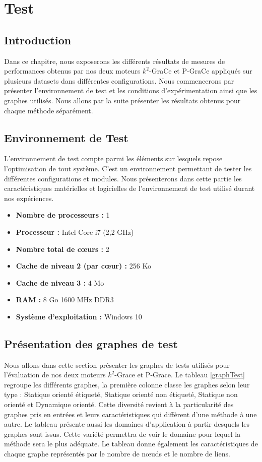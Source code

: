 \chapter{Test}
	\section{Introduction}
	
Dans ce chapitre, nous exposerons les différents résultats de mesures de performances obtenus par nos deux moteurs $k^2$-GraCe et P-GraCe appliqués sur plusieurs datasets dans différentes configurations. Nous commencerons par présenter l'environnement de test et les conditions d'expérimentation ainsi que les graphes utilisés. Nous allons par la suite présenter les résultats obtenus pour chaque méthode séparément. 


	
	
	\section{Environnement de Test}
	L'environnement de test compte parmi les éléments sur lesquels repose l'optimisation de tout système. C'est un environnement permettant de tester les différentes configurations et modules. Nous présenterons dans cette partie les caractéristiques matérielles et logicielles de l'environnement de test utilisé durant nos expériences. 

	
	\begin{itemize}[label=$\bullet$]
		\item \textbf{Nombre de processeurs :}	1
		\item \textbf{Processeur :} Intel Core i7 (2,2 GHz)
  		\item \textbf{Nombre total de cœurs :}	2
  		\item \textbf{Cache de niveau 2 (par cœur) :}	256 Ko
  		\item \textbf{Cache de niveau 3 :}	4 Mo
		\item \textbf{RAM : } 8 Go 1600 MHz DDR3
		\item \textbf{Système d'exploitation : } Windows 10
	\end{itemize}
	\section{Présentation des graphes de test}
	Nous allons dans cette section présenter les graphes de tests utilisés pour l'évaluation de nos deux moteurs $k^2$-Grace et P-Grace. 
	 Le tableau \ref{graphTest} regroupe les différents graphes, la première colonne classe les graphes selon leur type : Statique orienté étiqueté, Statique orienté non étiqueté, Statique non orienté et Dynamique orienté. Cette diversité revient à la particularité des graphes pris en entrées et leurs caractéristiques qui diffèrent d'une méthode à une autre.
Le tableau présente aussi les domaines d'application à partir desquels  les graphes sont issus. Cette variété permettra de voir le domaine pour lequel la méthode sera le plus adéquate. Le tableau donne également les caractéristiques de chaque graphe représentés par le nombre de nœuds et le nombre de liens. 
	 

